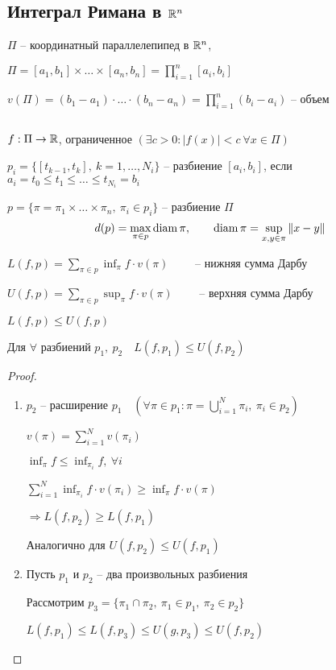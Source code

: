     \subsection*{Интеграл Римана в $\mathbb{R}^n$}

    $\Pi$ -- координатный параллелепипед в $\mathbb{R}^n$,
    \par $\Pi = [a_1, b_1] \times \dots \times [a_n, b_n] = \prod_{i=1}^n [a_i, b_i]$
    \par $v(\Pi) = (b_1 - a_1) \cdot \dots \cdot (b_n - a_n) = \prod_{i=1}^n (b_i - a_i)$ -- объем
    \par $ $
    \par $f : \Pi \rightarrow \mathbb{R}$, ограниченное \quad $(\exists c > 0 : |f(x)| < c \ \forall x \in \Pi)$
    \par $p_i = \{[t_{k-1}, t_k], \ k = 1, \dots, N_i\}$ -- разбиение $[a_i, b_i]$, если $a_i = t_0 \le t_1 \le \dots \le t_{N_i} = b_i$
    \par $p = \{\pi = \pi_1 \times \dots \times \pi_n, \ \pi_i \in p_i\}$ -- разбиение $\Pi$
    \[
        d(p) = \max_{\pi \in p} \operatorname{diam} \pi, \qquad \operatorname{diam} \pi = \sup_{x, y \in \pi} \|x - y\|    
    \]
    \par $L(f, p) = \sum_{\pi \in p} \inf_\pi f \cdot v(\pi) \qquad$ -- нижняя сумма Дарбу
    \par $U(f, p) = \sum_{\pi \in p} \sup_\pi f \cdot v(\pi) \qquad$ -- верхняя сумма Дарбу
    \par $L(f, p) \le U(f, p)$

    \begin{lemma}
        Для $\forall$ разбиений $p_1, \ p_2 \quad L(f, p_1) \le U(f, p_2)$
    \end{lemma}
    \begin{proof}
        $ $
        \begin{enumerate}
            \item $p_2$ -- расширение $p_1 \quad (\forall \pi \in p_1 : \pi = \bigcup_{i=1}^N \pi_i, \ \pi_i \in p_2)$
                \par $v(\pi) = \sum_{i=1}^N v(\pi_i)$
                \par $\inf_\pi f \le \inf_{\pi_i} f, \ \forall i$
                \par $\sum_{i=1}^N \inf_{\pi_i} f \cdot v(\pi_i) \ge \inf_\pi f \cdot v(\pi)$
                \par $\Rightarrow L(f, p_2) \ge L(f, p_1)$
                \par Аналогично для $U(f, p_2) \le U(f, p_1)$
            \item Пусть $p_1$ и $p_2$ -- два произвольных разбиения
                \par Рассмотрим $p_3 = \{\pi_1 \cap \pi_2, \ \pi_1 \in p_1, \ \pi_2 \in p_2\}$
                \par $L(f, p_1) \le L(f, p_3) \le U(g, p_3) \le U(f, p_2)$
        \end{enumerate}
    \end{proof}

